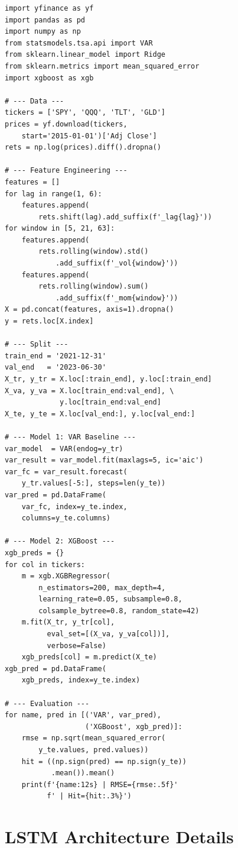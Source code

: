 \documentclass[11pt,a4paper,twocolumn]{article}
\begin{document}
\begin{lstlisting}[caption={End-to-end forecasting pipeline.}]
import yfinance as yf
import pandas as pd
import numpy as np
from statsmodels.tsa.api import VAR
from sklearn.linear_model import Ridge
from sklearn.metrics import mean_squared_error
import xgboost as xgb

# --- Data ---
tickers = ['SPY', 'QQQ', 'TLT', 'GLD']
prices = yf.download(tickers,
    start='2015-01-01')['Adj Close']
rets = np.log(prices).diff().dropna()

# --- Feature Engineering ---
features = []
for lag in range(1, 6):
    features.append(
        rets.shift(lag).add_suffix(f'_lag{lag}'))
for window in [5, 21, 63]:
    features.append(
        rets.rolling(window).std()
            .add_suffix(f'_vol{window}'))
    features.append(
        rets.rolling(window).sum()
            .add_suffix(f'_mom{window}'))
X = pd.concat(features, axis=1).dropna()
y = rets.loc[X.index]

# --- Split ---
train_end = '2021-12-31'
val_end   = '2023-06-30'
X_tr, y_tr = X.loc[:train_end], y.loc[:train_end]
X_va, y_va = X.loc[train_end:val_end], \
             y.loc[train_end:val_end]
X_te, y_te = X.loc[val_end:], y.loc[val_end:]

# --- Model 1: VAR Baseline ---
var_model  = VAR(endog=y_tr)
var_result = var_model.fit(maxlags=5, ic='aic')
var_fc = var_result.forecast(
    y_tr.values[-5:], steps=len(y_te))
var_pred = pd.DataFrame(
    var_fc, index=y_te.index,
    columns=y_te.columns)

# --- Model 2: XGBoost ---
xgb_preds = {}
for col in tickers:
    m = xgb.XGBRegressor(
        n_estimators=200, max_depth=4,
        learning_rate=0.05, subsample=0.8,
        colsample_bytree=0.8, random_state=42)
    m.fit(X_tr, y_tr[col],
          eval_set=[(X_va, y_va[col])],
          verbose=False)
    xgb_preds[col] = m.predict(X_te)
xgb_pred = pd.DataFrame(
    xgb_preds, index=y_te.index)

# --- Evaluation ---
for name, pred in [('VAR', var_pred),
                   ('XGBoost', xgb_pred)]:
    rmse = np.sqrt(mean_squared_error(
        y_te.values, pred.values))
    hit = ((np.sign(pred) == np.sign(y_te))
           .mean()).mean()
    print(f'{name:12s} | RMSE={rmse:.5f}'
          f' | Hit={hit:.3%}')
\end{lstlisting}

\section{LSTM Architecture Details}\label{app:lstm}
\end{document}
